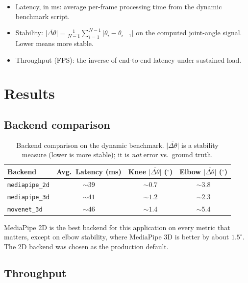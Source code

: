 \documentclass{article}
\begin{document}
\begin{itemize}
  \item Latency, in ms: average per-frame processing time from the
    dynamic benchmark script.
  \item Stability:
    $\overline{|\Delta\theta|}
      = \frac{1}{N{-}1}\sum_{i=1}^{N-1}|\theta_i - \theta_{i-1}|$
    on the computed joint-angle signal. Lower means more stable.
  \item Throughput (FPS): the inverse of end-to-end latency under
    sustained load.
\end{itemize}

\section{Results}

\subsection{Backend comparison}

\begin{table}[h]
\centering
\begin{tabularx}{\textwidth}{lccc}
\toprule
\textbf{Backend} & \textbf{Avg.\ Latency (ms)} &
  \textbf{Knee $\overline{|\Delta\theta|}$ ($^\circ$)} &
  \textbf{Elbow $\overline{|\Delta\theta|}$ ($^\circ$)}\\
\midrule
\texttt{mediapipe\_2d} & ${\sim}39$ & ${\sim}0.7$ & ${\sim}3.8$\\
\texttt{mediapipe\_3d} & ${\sim}41$ & ${\sim}1.2$ & ${\sim}2.3$\\
\texttt{movenet\_3d}   & ${\sim}46$ & ${\sim}1.4$ & ${\sim}5.4$\\
\bottomrule
\end{tabularx}
\caption{Backend comparison on the dynamic benchmark.
$\overline{|\Delta\theta|}$ is a stability measure (lower is more
stable); it is \emph{not} error vs.\ ground truth.}
\label{tab:bench}
\end{table}

MediaPipe 2D is the best backend for this application on every metric
that matters, except on elbow stability, where MediaPipe 3D is better
by about $1.5^\circ$. The 2D backend was chosen as the production
default.

\subsection{Throughput}
\end{document}
